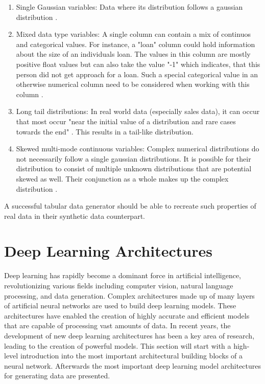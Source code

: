 \begin{enumerate}
    \item Single Gaussian variables: Data where its distribution follows a gaussian distribution \cite{zhao2022CTABGANEnhancingTabular}.
    \item Mixed data type variables: A single column can contain a mix of continuos and categorical values. 
    For instance, a "loan" column could hold information about the size of an individuals loan.
    The values in this column are mostly positive float values but can also take the value "-1" which indicates, that this person did not get approach for a loan.
    Such a special categorical value in an otherwise numerical column need to be considered when working with this column \cite{zhao2022CTABGANEnhancingTabular}.
    \item Long tail distributions: In real world data (especially sales data), it can occur that most occur "near the initial value of a distribution and rare cases towards the end" \cite[p. 3]{zhao2022CTABGANEnhancingTabular}.
    This results in a tail-like distribution.
    \item Skewed multi-mode continuous variables: Complex numerical distributions do not necessarily follow a single gaussian distributions.
    It is possible for their distribution to consist of multiple unknown distributions that are potential skewed as well. 
    Their conjunction as a whole makes up the complex distribution \cite{zhao2022CTABGANEnhancingTabular}.
\end{enumerate}

A successful tabular data generator should be able to recreate such properties of real data in their synthetic data counterpart.



\section{Deep Learning Architectures}
\label{ch:preliminaries-deepLearningArchitectures}

Deep learning has rapidly become a dominant force in artificial intelligence, revolutionizing various fields including computer vision, natural language processing, and data generation. 
Complex architectures made up of many layers of artificial neural networks are used to build deep learning models.
These architectures have enabled the creation of highly accurate and efficient models that are capable of processing vast amounts of data. 
In recent years, the development of new deep learning architectures has been a key area of research, leading to the creation of powerful models.
This section will start with a high-level introduction into the most important architectural building blocks of a neural network.
Afterwards the most important deep learning \gls{model} architectures for generating data are presented.

